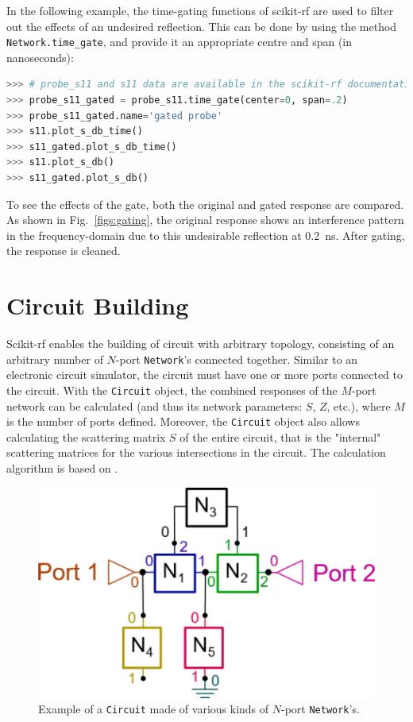 \documentclass{IEEEjmw}
\begin{document}
In the following example, the time-gating functions of scikit-rf are used to filter out the effects of an undesired reflection. This can be done by using the method \texttt{Network.time\_gate}, and provide it an appropriate centre and span (in nanoseconds):

\begin{lstlisting}[language=Python]
>>> # probe_s11 and s11 data are available in the scikit-rf documentation
>>> probe_s11_gated = probe_s11.time_gate(center=0, span=.2)
>>> probe_s11_gated.name='gated probe'
>>> s11.plot_s_db_time()
>>> s11_gated.plot_s_db_time()
>>> s11.plot_s_db()
>>> s11_gated.plot_s_db()
\end{lstlisting}

To see the effects of the gate, both the original and gated response are compared. As shown in Fig.~\ref{figs:gating}, the original response shows an interference pattern in the frequency-domain due to this undesirable reflection at \SI{0.2}{\nano\second}. After gating, the response is cleaned.


\section{Circuit Building}
Scikit-rf enables the building of circuit with arbitrary topology, consisting of an arbitrary number of $N$-port \texttt{Network}'s connected together. Similar to an electronic circuit simulator, the circuit must have one or more ports connected to the circuit. With the \texttt{Circuit} object, the combined responses of the $M$-port network can be calculated (and thus its network parameters: $S$, $Z$, etc.), where $M$ is the number of ports defined. Moreover, the \texttt{Circuit} object also allows calculating the scattering matrix $S$ of the entire circuit, that is the "internal" scattering matrices for the various intersections in the circuit. The calculation algorithm is based on \cite{hallbjorner2003}.

\begin{figure}
	\centering
	\includegraphics[width=0.95\linewidth]{figures/circuit}
	\caption{ Example of a \texttt{Circuit} made of various kinds of $N$-port \texttt{Network}'s.}
	\label{fig:circuit}
\end{figure}
\end{document}
